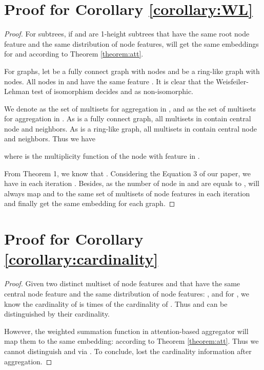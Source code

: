 \documentclass[letterpaper]{article} \usepackage{aaai20}  \usepackage{times}  \usepackage{helvet} \usepackage{courier}  \usepackage[hyphens]{url}  \usepackage{graphicx} \urlstyle{rm} \def\UrlFont{\rm}  \usepackage{graphicx}  \frenchspacing  \setlength{\pdfpagewidth}{8.5in}  \setlength{\pdfpageheight}{11in}
\theoremstyle{plain}
\theoremstyle{definition}
\begin{document}
\section{Proof for Corollary \ref{corollary:WL}}
\begin{proof}
For subtrees, if  and  are 1-height subtrees that have the same root node feature and the same distribution of node features,  will get the same embeddings for  and  according to Theorem \ref{theorem:att}.

For graphs, let  be a fully connect graph with  nodes and  be a ring-like graph with  nodes. All nodes in  and  have the same feature . It is clear that the Weisfeiler-Lehman test of isomorphism decides  and  as non-isomorphic.

We denote  as the set of multisets for aggregation in , and  as the set of multisets for aggregation in . As  is a fully connect graph, all multisets in  contain  central node and  neighbors. As  is a ring-like graph, all multisets in  contain  central node and  neighbors. Thus we have


where  is the multiplicity function of the node with feature  in .

From Theorem 1, we know that . Considering the Equation 3 of our paper, we have  in each iteration . Besides, as the number of node in  and  are equals to ,  will always map  and  to the same set of multisets of node features  in each iteration  and finally get the same embedding for each graph.
\end{proof}

\section{Proof for Corollary \ref{corollary:cardinality}}
\begin{proof}
Given two distinct multiset of node features  and  that have the same central node feature and the same distribution of node features: ,  and  for , we know the cardinality of  is  times of the cardinality of . Thus  and  can be distinguished by their cardinality. 

However, the weighted summation function  in attention-based aggregator  will map them to the same embedding:  according to Theorem \ref{theorem:att}. Thus we cannot distinguish  and  via . To conclude,  lost the cardinality information after aggregation.
\end{proof}
\end{document}
